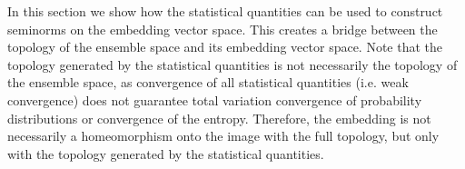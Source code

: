 
In this section we show how the statistical quantities can be used to construct seminorms on the embedding vector space. This creates a bridge between the topology of the ensemble space and its embedding vector space. Note that the topology generated by the statistical quantities is not necessarily the topology of the ensemble space, as convergence of all statistical quantities (i.e. weak convergence) does not guarantee total variation convergence of probability distributions or convergence of the entropy. Therefore, the embedding is not necessarily a homeomorphism onto the image with the full topology, but only with the topology generated by the statistical quantities.

